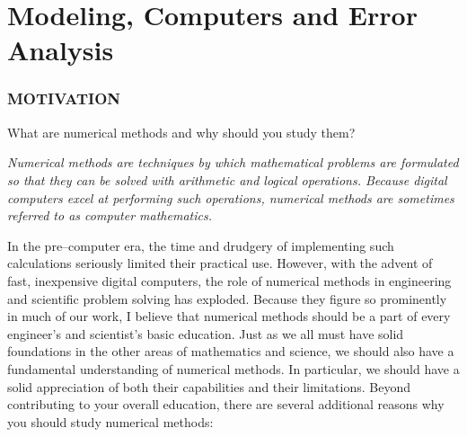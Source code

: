 \documentclass[../main.tex]{subfiles}
\begin{document}
\part{Modeling, Computers and Error Analysis}
\label{part:part1}

\section{MOTIVATION}
\label{cha:cha1}
What are numerical methods and why should you study them?


\textsl{Numerical methods are techniques by which mathematical problems are formulated so
that they can be solved with arithmetic and logical operations. Because digital computers
excel at performing such operations, numerical methods are sometimes referred to as computer mathematics.}


In the pre–computer era, the time and drudgery of implementing such calculations
seriously limited their practical use. However, with the advent of fast, inexpensive digital
computers, the role of numerical methods in engineering and scientific problem solving
has exploded. Because they figure so prominently in much of our work, I believe that numerical methods should be a part of every engineer’s and scientist’s basic education. Just
as we all must have solid foundations in the other areas of mathematics and science, we
should also have a fundamental understanding of numerical methods. In particular, we should
have a solid appreciation of both their
capabilities and their limitations.
Beyond contributing to your overall
education, there are several additional
reasons why you should study numerical
methods:
\end{document}
